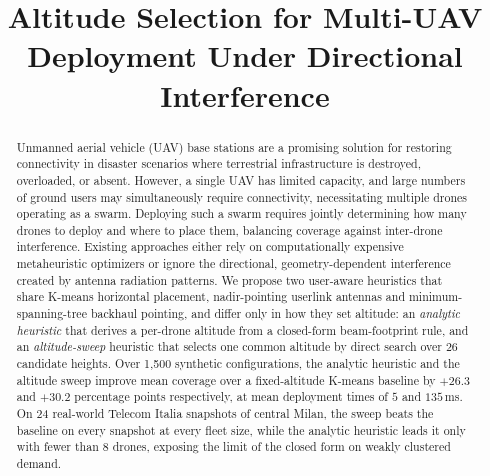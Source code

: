 \documentclass[conference]{IEEEtran}
\begin{document}
\title{Altitude Selection for Multi-UAV Deployment Under Directional Interference}


\author{
}


\maketitle

\begin{abstract}
Unmanned aerial vehicle (UAV) base stations are a promising solution for restoring connectivity in disaster scenarios where terrestrial infrastructure is destroyed, overloaded, or absent. However, a single UAV has limited capacity, and large numbers of ground users may simultaneously require connectivity, necessitating multiple drones operating as a swarm. Deploying such a swarm requires jointly determining how many drones to deploy and where to place them, balancing coverage against inter-drone interference. Existing approaches either rely on computationally expensive metaheuristic optimizers or ignore the directional, geometry-dependent interference created by antenna radiation patterns. We propose two user-aware heuristics that share K-means horizontal placement, nadir-pointing userlink antennas and minimum-spanning-tree backhaul pointing, and differ only in how they set altitude: an \emph{analytic heuristic} that derives a per-drone altitude from a closed-form beam-footprint rule, and an \emph{altitude-sweep} heuristic that selects one common altitude by direct search over $26$ candidate heights. Over 1{,}500 synthetic configurations, the analytic heuristic and the altitude sweep improve mean coverage over a fixed-altitude K-means baseline by $+26.3$ and $+30.2$ percentage points respectively, at mean deployment times of $5$ and $135$\,ms. On 24 real-world Telecom Italia snapshots of central Milan, the sweep beats the baseline on every snapshot at every fleet size, while the analytic heuristic leads it only with fewer than $8$ drones, exposing the limit of the closed form on weakly clustered demand.




\end{abstract}
\end{document}

